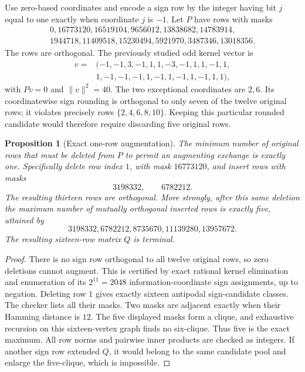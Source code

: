 \documentclass[11pt]{article}
\newtheorem{proposition}[theorem]{Proposition}
\begin{document}
Use zero-based coordinates and encode a sign row by the integer having
bit $j$ equal to one exactly when coordinate $j$ is $-1$. Let $P$
have rows with masks
\[
\begin{gathered}
0,16773120,16519104,9656012,13838682,14783914,\\
1944718,11409518,15230494,5921970,3487346,13018356.
\end{gathered}
\]
The rows are orthogonal. The previously studied odd kernel vector is
\[
\begin{split}
v={}&(-1,-1,3,-1,1,1,-3,-1,1,1,-1,1,\\
&1,-1,-1,-1,1,-1,1,-1,1,-1,1,1),
\end{split}
\]
with $Pv=0$ and $\|v\|^2=40$. The two exceptional coordinates are
$2,6$. Its coordinatewise sign rounding is orthogonal to only seven
of the twelve original rows; it violates precisely rows
$\{2,4,6,8,10\}$. Keeping this particular rounded candidate would
therefore require discarding five original rows.

\begin{proposition}[Exact one-row augmentation]
The minimum number of original rows that must be deleted from $P$
to permit an augmenting exchange is exactly one. Specifically delete
row index $1$, with mask $16773120$, and insert rows with masks
\[
3198332,\qquad6782212.
\]
The resulting thirteen rows are orthogonal. More strongly, after this
same deletion the maximum number of mutually orthogonal inserted
rows is exactly five, attained by
\[
3198332,6782212,8735670,11139280,13957672.
\]
The resulting sixteen-row matrix $Q$ is terminal.
\end{proposition}
\begin{proof}
There is no sign row orthogonal to all twelve original rows, so zero
deletions cannot augment. This is certified by exact rational kernel
elimination and enumeration of its $2^{11}=2048$ information-coordinate
sign assignments, up to negation.
Deleting row $1$ gives exactly sixteen antipodal sign-candidate classes.
The checker lists all their masks. Two masks are adjacent exactly when
their Hamming distance is $12$. The five displayed masks form a clique,
and exhaustive recursion on this sixteen-vertex graph finds no
six-clique. Thus five is the exact maximum. All row norms and pairwise
inner products are checked as integers.
If another sign row extended $Q$, it would belong to the same candidate
pool and enlarge the five-clique, which is impossible.
\end{proof}
\end{document}
